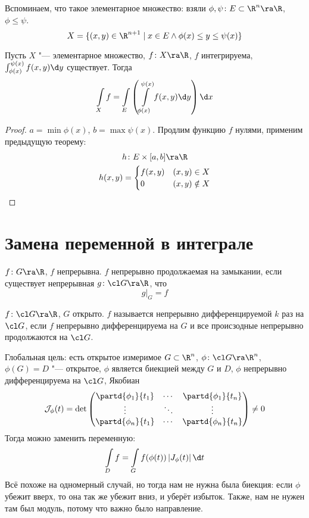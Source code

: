 \begin{Rem}
	Вспоминаем, что такое элементарное множество: взяли $\phi, \psi\colon E \subset \R^n \ra \R$, $\phi \le \psi$.
	\[ X = \{ (x, y) \in \R^{n+1} \mid x \in E \land \phi(x) \le y \le \psi(x)\} \]
\end{Rem}
\begin{theorem}
	Пусть $X$ "--- элементарное множество, $f\colon X \ra \R$, $f$ интегрируема, $\int_{\phi(x)}^{\psi(x)} f(x, y) \d y$ существует.
	Тогда
	\[ \int\limits_X f = \int\limits_E \left( \int\limits_{\phi(x)}^{\psi(x)} f(x, y) \d y \right) \d x \]
\end{theorem}
\begin{proof}
	$a = \min \phi(x)$, $b = \max \psi(x)$.
	Продлим функцию $f$ нулями, применим предыдущую теорему:
	\begin{gather*}
		h\colon E \times [a, b] \ra \R \\
		h(x, y) = \begin{cases} f(x, y) & (x, y) \in X \\ 0 & (x, y) \notin X \end{cases}
	\end{gather*}
\end{proof}

\section{Замена переменной в интеграле}

\begin{Def}
	$f\colon G \ra \R$, $f$ непрерывна.
	$f$ непрерывно продолжаемая на замыкании, если существует непрерывная $g\colon \cl G \ra \R$, что
	\[ g \biggr|_G = f \]
\end{Def}

\begin{Def}
	$f\colon \cl G \ra \R$, $G$ открыто.
	$f$ называется непрерывно дифференцируемой $k$ раз на $\cl G$,
	если $f$ непрерывно дифференцируема на $G$ и все происзодные непрерывно продолжаются на $\cl G$.
\end{Def}

Глобальная цель: есть открытое измеримое $G \subset \R^n$, $\phi\colon \cl G \ra \R^n$,
$\phi(G) = D$ "--- открытое, $\phi$ является биекцией между $G$ и $D$, $\phi$ непрерывно дифференцируема на $\cl G$,
Якобиан
\[	\mathcal J_\phi(t) = \det \begin{pmatrix}
		\partd{\phi_1}{t_1} & \cdots & \partd{\phi_1}{t_n} \\
		\vdots & \ddots & \vdots \\
		\partd{\phi_n}{t_1} & \cdots & \partd{\phi_n}{t_n}
	\end{pmatrix} \ne 0
\]
Тогда можно заменить переменную:
\[
	\int\limits_D f = \int\limits_G f(\phi(t)) \left| J_\phi(t) \right| \d t
\]
Всё похоже на одномерный случай, но тогда нам не нужна была биекция: если $\phi$ убежит вверх, то она так же убежит вниз, и уберёт избыток.
Также, нам не нужен там был модуль, потому что важно было направление.
